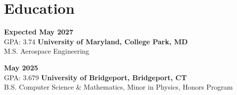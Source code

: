 \section{Education}
    \begin{twocolentry}{
        \textbf{Expected May 2027} \\
        GPA: 3.74
    }
        \textbf{University of Maryland, College Park, MD} \\
        M.S. Aerospace Engineering
    \end{twocolentry}

    \vspace{0.10 cm}
    
	\begin{twocolentry}{
    	\textbf{May 2025} \\
    	GPA: 3.679
	}
    	\textbf{University of Bridgeport, Bridgeport, CT} \\
    	B.S. Computer Science \& Mathematics, Minor in Physics, Honors Program
	\end{twocolentry}